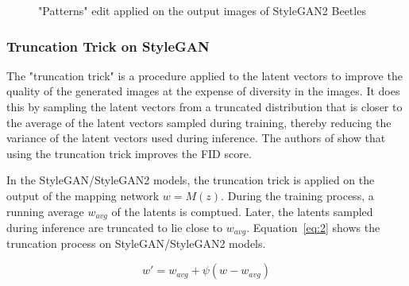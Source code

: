 \begin{figure}[H]



\caption{"Patterns" edit applied on the output images of StyleGAN2 Beetles}

\end{figure}

\subsubsection{Truncation Trick on StyleGAN}

The "truncation trick" is a procedure applied to the latent vectors to improve the quality of the generated images at the expense of diversity in the images. It does this by sampling the latent vectors from a truncated distribution that is closer to the average of the latent vectors sampled during training, thereby reducing the variance of the latent vectors used during inference. The authors of \cite{biggan} show that using the truncation trick improves the FID score.

In the StyleGAN/StyleGAN2 models, the truncation trick is applied on the output of the mapping network $w = M(z)$. During the training process, a running average $w_{avg}$ of the latents is comptued. Later, the latents sampled during inference are truncated to lie close to $w_{avg}$. Equation~\ref{eq:2} shows the truncation process on StyleGAN/StyleGAN2 models.

\begin{equation}
    w' = w_{avg} + \psi (w - w_{avg})
    \label{eq:2}
\end{equation}

